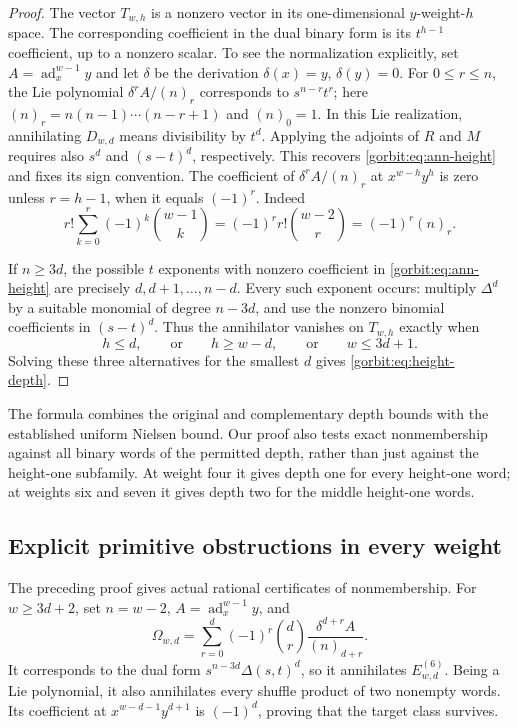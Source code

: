 \begin{proof}
The vector $T_{w,h}$ is a nonzero vector in its one-dimensional
$y$-weight-$h$ space. The corresponding coefficient in the dual binary
form is its $t^{h-1}$ coefficient, up to a nonzero scalar. To see the
normalization explicitly, set $A=\operatorname{ad}_x^{w-1}y$ and let
$\delta$ be the derivation $\delta(x)=y$, $\delta(y)=0$.
For $0\le r\le n$, the Lie polynomial
$\delta^r A/(n)_r$ corresponds to $s^{n-r}t^r$; here
$(n)_r=n(n-1)\cdots(n-r+1)$ and $(n)_0=1$. In this Lie realization,
annihilating $D_{w,d}$ means divisibility by $t^d$. Applying the adjoints
of $R$ and $M$ requires also $s^d$ and $(s-t)^d$, respectively. This
recovers \eqref{gorbit:eq:ann-height} and fixes its sign convention.
The coefficient of $\delta^r A/(n)_r$ at
$x^{w-h}y^h$ is zero unless $r=h-1$, when it equals $(-1)^r$.
Indeed
\[
 r!\sum_{k=0}^{r}(-1)^k\binom{w-1}{k}
   =(-1)^r r!\binom{w-2}{r}=(-1)^r(n)_r.
\]

If $n\ge3d$, the possible $t$ exponents with nonzero coefficient in
\eqref{gorbit:eq:ann-height} are precisely
$d,d+1,\ldots,n-d$. Every such exponent occurs: multiply
$\Delta^d$ by a suitable monomial of degree $n-3d$, and use the
nonzero binomial coefficients in $(s-t)^d$.
Thus the annihilator vanishes on $T_{w,h}$ exactly when
\[
 h\le d,\qquad\text{or}\qquad h\ge w-d,
 \qquad\text{or}\qquad w\le3d+1.
\]
Solving these three alternatives for the smallest $d$ gives
\eqref{gorbit:eq:height-depth}.
\end{proof}

The formula combines the original and complementary depth bounds with
the established uniform Nielsen bound. Our proof also tests exact
nonmembership against all binary words of the permitted depth, rather
than just against the height-one subfamily. At weight four it gives
depth one for every height-one word; at weights six and seven it gives
depth two for the middle height-one words.

\subsection{Explicit primitive obstructions in every weight}

The preceding proof gives actual rational certificates of nonmembership.
For $w\ge3d+2$, set $n=w-2$, $A=\operatorname{ad}_x^{w-1}y$, and
\begin{equation}\label{gorbit:eq:omega-general}
 \Omega_{w,d}=
 \sum_{r=0}^{d}(-1)^r\binom dr
          \frac{\delta^{d+r}A}{(n)_{d+r}}.
\end{equation}
It corresponds to the dual form
$s^{n-3d}\Delta(s,t)^d$, so it annihilates
$E^{(6)}_{w,d}$. Being a Lie polynomial, it also annihilates every
shuffle product of two nonempty words. Its coefficient at
$x^{w-d-1}y^{d+1}$ is $(-1)^d$, proving that the target class survives.

